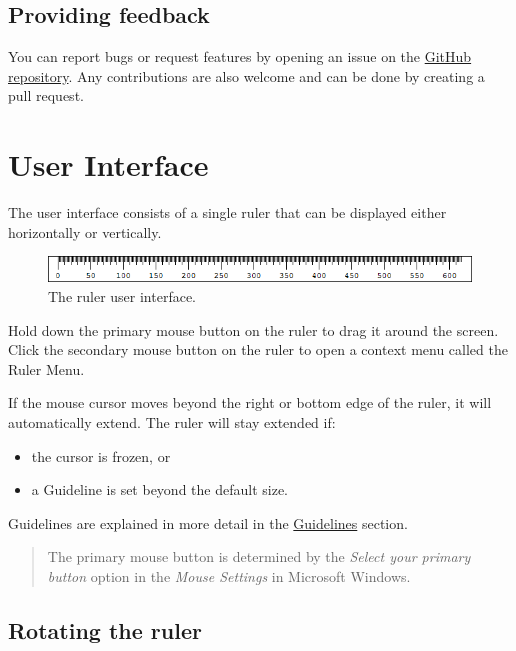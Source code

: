 \documentclass[
]{book}
\providecommand{\tightlist}{%
  \setlength{\itemsep}{0pt}\setlength{\parskip}{0pt}}
\begin{document}
\section{Providing feedback}\label{providing-feedback}

You can report bugs or request features by opening an issue on the \href{https://github.com/Cossey/ScreenPixelRuler2}{GitHub repository}.
Any contributions are also welcome and can be done by creating a pull request.

\chapter{User Interface}\label{ui}

The user interface consists of a single ruler that can be displayed either horizontally or vertically.

\begin{figure}
\centering
\includegraphics{images/ruler.png}
\caption{\label{fig:unnamed-chunk-1}The ruler user interface.}
\end{figure}

Hold down the primary mouse button on the ruler to drag it around the screen.
Click the secondary mouse button on the ruler to open a context menu called the Ruler Menu.

If the mouse cursor moves beyond the right or bottom edge of the ruler, it will automatically extend.
The ruler will stay extended if:

\begin{itemize}
\tightlist
\item
  the cursor is frozen, or
\item
  a Guideline is set beyond the default size.
\end{itemize}

Guidelines are explained in more detail in the \hyperref[guidelines]{Guidelines} section.

\begin{quote}
The primary mouse button is determined by the \emph{Select your primary button} option in the \emph{Mouse Settings} in Microsoft Windows.
\end{quote}

\section{Rotating the ruler}\label{rotating-the-ruler}
\end{document}
